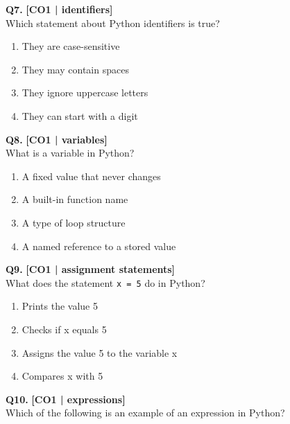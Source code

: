\noindent\textbf{Q7.} \hfill {\small\color{LPUOrange}\textbf{[CO1 | identifiers]}}\\[2pt]
Which statement about Python identifiers is true?

\begin{enumerate}[label=(\alph*),topsep=2pt,itemsep=1pt,partopsep=0pt,parsep=0pt]
    \item \relax They are case-sensitive
    \item \relax They may contain spaces
    \item \relax They ignore uppercase letters
    \item \relax They can start with a digit
\end{enumerate}
\vspace{{2mm}}

\noindent\textbf{Q8.} \hfill {\small\color{LPUOrange}\textbf{[CO1 | variables]}}\\[2pt]
What is a variable in Python?

\begin{enumerate}[label=(\alph*),topsep=2pt,itemsep=1pt,partopsep=0pt,parsep=0pt]
    \item \relax A fixed value that never changes
    \item \relax A built-in function name
    \item \relax A type of loop structure
    \item \relax A named reference to a stored value
\end{enumerate}
\vspace{{2mm}}

\noindent\textbf{Q9.} \hfill {\small\color{LPUOrange}\textbf{[CO1 | assignment statements]}}\\[2pt]
What does the statement \texttt{x = 5} do in Python?

\begin{enumerate}[label=(\alph*),topsep=2pt,itemsep=1pt,partopsep=0pt,parsep=0pt]
    \item \relax Prints the value 5
    \item \relax Checks if x equals 5
    \item \relax Assigns the value 5 to the variable x
    \item \relax Compares x with 5
\end{enumerate}
\vspace{{2mm}}

\noindent\textbf{Q10.} \hfill {\small\color{LPUOrange}\textbf{[CO1 | expressions]}}\\[2pt]
Which of the following is an example of an expression in Python?

